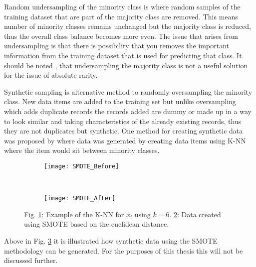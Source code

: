 Random undersampling of the minority class is where random samples of the training dataset that are part of the majority class are removed. This means number of minority classes remains unchanged but the majority class is reduced, thus the overall class balance becomes more even. The issue that arises from undersampling is that there is possibility that you removes the important information from the training dataset that is used for predicting that class. It should be noted \cite{kennedy_credit_2013}, that undersampling the majority class is not a useful solution for the issue of absolute rarity.

Synthetic sampling  is alternative method to randomly oversampling the minority class. New data items are added to the training set but unlike oversampling which adds duplicate records the records added are dummy or made up in a way to look similar and taking characteristics of the already existing records, thus they are not duplicates but synthetic. One method for creating synthetic data was proposed by \citep{chawla_smote:_2002} where data was generated by creating data items using K-NN where the item would sit between minority classes. 

\begin{figure}[H]
	\centering
	\begin{subfigure}[b]{0.32\textwidth}
		\captionsetup{font=scriptsize}
		\texttt{[image: SMOTE\_Before]}\caption{}
		\label{fig:SMOTE_Before}
	\end{subfigure}  ~\quad
	\begin{subfigure}[b]{0.32\textwidth}
		\captionsetup{font=scriptsize}
		\texttt{[image: SMOTE\_After]}
		\caption{}
		\label{fig:SMOTE_After}
	\end{subfigure}
\caption{Fig. \ref{fig:SMOTE_Before}: Example of the K-NN for $x_i$ using $k = 6$. \ref{fig:SMOTE_After}: Data created using SMOTE based on the euclidean distance.\\
	\cite[Source:][]{he_learning_2009}}
\label{fig:smoteExample}
\end{figure}

Above in Fig. \ref{fig:smoteExample} it is illustrated how synthetic data using the SMOTE methodology can be generated. For the purposes of this thesis this will not be discussed further.

